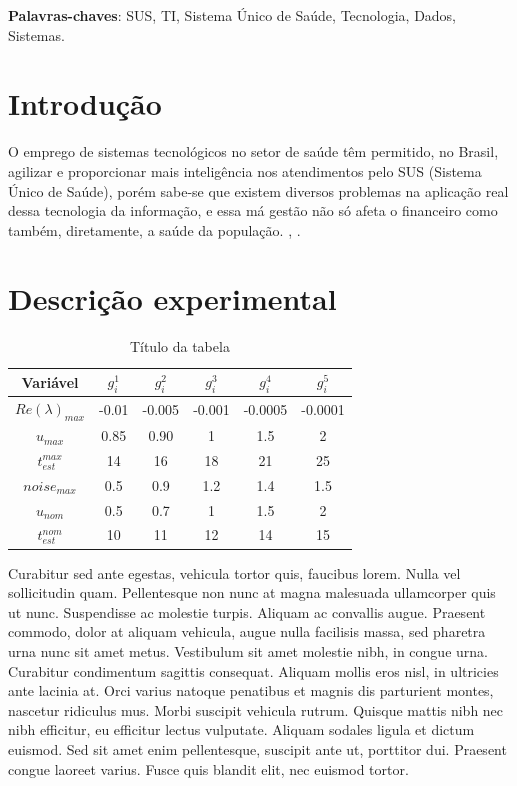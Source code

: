 \documentclass[twoside]{article}
\begin{document}
\textbf{Palavras-chaves}: SUS, TI, Sistema Único de Saúde, Tecnologia, Dados, Sistemas.
%
\vspace{0.5cm}
\begin{multicols}{2}

  \section{Introdução}

  O emprego de sistemas tecnológicos no setor de saúde têm permitido, no Brasil, agilizar e proporcionar mais inteligência nos atendimentos pelo SUS (Sistema Único de Saúde), porém sabe-se que existem diversos problemas na aplicação real dessa tecnologia da informação, e essa má gestão não só afeta o financeiro como também, diretamente, a saúde da população.
  \cite{Oliveira_2017}, \cite{Pinheiro_Filho_2012}.

  \section{Descrição experimental}




  \begin{table}
    \centering
    \caption{Título da tabela}
    \begin{tabular}{cc c c c c}
      \hline
      Variável            & $g_i^1$ & $g_i^2$ & $g_i^3$ & $g_i^4$ & $g_i^5$ \\
      \hline
      $Re(\lambda)_{max}$ & -0.01   & -0.005  & -0.001  & -0.0005 & -0.0001 \\
      $u_{max}$           & 0.85    & 0.90    & 1       & 1.5     & 2       \\
      $t_{est}^{max}$     & 14      & 16      & 18      & 21      & 25      \\
      $noise_{max}$       & 0.5     & 0.9     & 1.2     & 1.4     & 1.5     \\
      $u_{nom}$           & 0.5     & 0.7     & 1       & 1.5     & 2       \\
      $t_{est}^{nom}$     & 10      & 11      & 12      & 14      & 15      \\
      \hline
    \end{tabular}
  \end{table}

  Curabitur sed ante egestas, vehicula tortor quis, faucibus lorem. Nulla vel sollicitudin quam. Pellentesque non nunc at magna malesuada ullamcorper quis ut nunc. Suspendisse ac molestie turpis. Aliquam ac convallis augue. Praesent commodo, dolor at aliquam vehicula, augue nulla facilisis massa, sed pharetra urna nunc sit amet metus. Vestibulum sit amet molestie nibh, in congue urna. Curabitur condimentum sagittis consequat. Aliquam mollis eros nisl, in ultricies ante lacinia at. Orci varius natoque penatibus et magnis dis parturient montes, nascetur ridiculus mus. Morbi suscipit vehicula rutrum. Quisque mattis nibh nec nibh efficitur, eu efficitur lectus vulputate. Aliquam sodales ligula et dictum euismod. Sed sit amet enim pellentesque, suscipit ante ut, porttitor dui. Praesent congue laoreet varius. Fusce quis blandit elit, nec euismod tortor.


\end{multicols}
\end{document}
